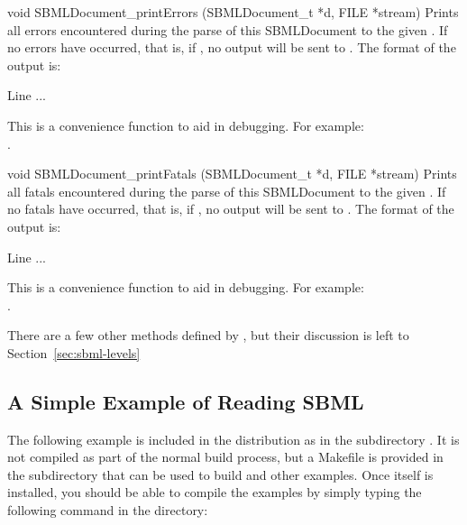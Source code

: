 \documentclass{sbmlmanual}
\begin{document}
\begin{methoddef}{void SBMLDocument\_printErrors (SBMLDocument\_t *d,
FILE *stream)}
  Prints all errors encountered during the parse of this SBMLDocument
  to the given .  If no errors have occurred, that is, if 
  , no output will be sent
  to . The format of the output is:
  \begin{example}
      Line %
      ...
  \end{example}
  This is a convenience function to aid in debugging.  For example:\\
  .
 \end{methoddef}
  

\begin{methoddef}{void SBMLDocument\_printFatals (SBMLDocument\_t *d,
FILE *stream)}
  Prints all fatals encountered during the parse of this SBMLDocument
  to the given .  If no fatals have occurred, that is, if
  , no output will be sent
  to . The format of the output is:
  \begin{example}
      Line %
      ...
  \end{example}
  This is a convenience function to aid in debugging.  For example:\\
  .
 \end{methoddef}

There are a few other methods defined by , but
their discussion is left to Section~\ref{sec:sbml-levels}


\subsection{A Simple Example of Reading SBML}
\label{sec:read-example}

The following example is included in the \libsbml{} distribution as
 in the subdirectory .  It is not
compiled as part of the normal build process, but a Makefile is provided in
the  subdirectory that can be used to build
 and other examples.  Once \libsbml{} itself is
installed, you should be able to compile the examples by simply typing the
following command in the  directory:
\end{document}
